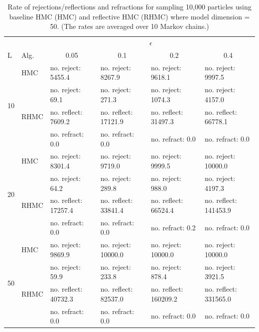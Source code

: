 \documentclass{article} %
\begin{document}
\begin {table}
\caption {Rate of rejections/reflections and refractions for sampling 10,000 particles using baseline HMC (HMC) and reflective HMC (RHMC) where model dimension = 50.
(The rates are averaged over 10 Markov chains.)   } \label{tab3} 
\center
\begin{tabular}{llllll} 
\hline 
 & &\multicolumn{4}{c}{$\epsilon$} \\ 
\cline{3-6} L & Alg.& \multicolumn{1}{c}{0.05} & \multicolumn{1}{c}{0.1} & \multicolumn{1}{c}{0.2} & \multicolumn{1}{c}{0.4}\\ 
\hline 
%
\multirow{4}{*}{10}& HMC &  no. reject: 5455.4& no. reject: 8267.9 & no. reject: 9618.1& no. reject: 9997.5\vspace{3pt}\\
%
& \multirow{3}{*}{RHMC}& no. reject: 69.1& no. reject: 271.3& no. reject: 1074.3& no. reject: 4157.0\\ 
& &        no. reflect: 7609.2& no. reflect: 17121.9& no. reflect: 31497.3& no. reflect: 66778.1\\ 
& &          no. refract: 0.0& no. refract: 0.0& no. refract: 0.0& no. refract: 0.0\vspace{12pt}\\ 
\multirow{4}{*}{20}& HMC &  no. reject: 8301.4& no. reject: 9719.0 & no. reject: 9999.5& no. reject: 10000.0\vspace{3pt}\\
%
& \multirow{3}{*}{RHMC}& no. reject: 64.2& no. reject: 289.8& no. reject: 988.0& no. reject: 4197.3\\ 
& &        no. reflect: 17257.4& no. reflect: 33841.4& no. reflect: 66524.4& no. reflect: 141453.9\\ 
& &          no. refract: 0.0& no. refract: 0.0& no. refract: 0.2& no. refract: 0.0\vspace{12pt}\\ 
\multirow{4}{*}{50}& HMC &  no. reject: 9869.9& no. reject: 10000.0 & no. reject: 10000.0& no. reject: 10000.0\vspace{3pt}\\
%
& \multirow{3}{*}{RHMC}& no. reject: 59.9& no. reject: 233.8& no. reject: 878.4& no. reject: 3921.5\\ 
& &        no. reflect: 40732.3& no. reflect: 82537.0& no. reflect: 160209.2& no. reflect: 331565.0\\ 
& &          no. refract: 0.0& no. refract: 0.0& no. refract: 0.0& no. refract: 0.0\vspace{12pt}\\ 

\end{tabular}
\end{table}
\end{document}
